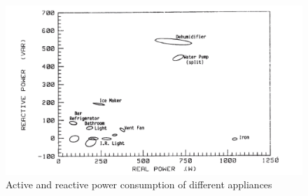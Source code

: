 \begin{figure}
	\centering
	\includegraphics[width=0.7\linewidth]{images/hart2}
	\caption[Active and reactive power consumption of different appliances]{Active and reactive power consumption of different appliances}
	\label{fig:hart2}
\end{figure}
